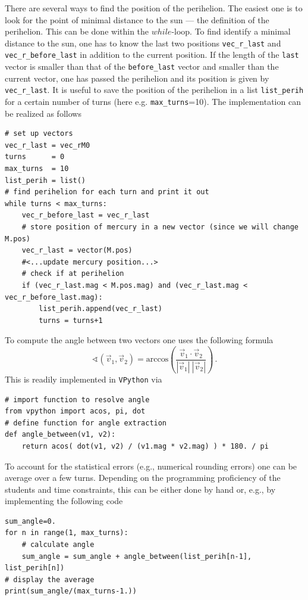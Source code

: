 \documentclass[12pt, UK english]{iopart}
\begin{document}
There are several ways to find the position of the perihelion.
The easiest one is to look for the point of minimal distance to the sun --- the definition of the perihelion.
This can be done within the $while$-loop.
To find identify a minimal distance to the sun, one has to know the last two positions \texttt{vec\_r\_last} and \texttt{vec\_r\_before\_last} in addition to the current position.
If the length of the \texttt{last} vector is smaller than that of the \texttt{before\_last} vector and smaller than the current vector, one has passed the perihelion and its position is given by \texttt{vec\_r\_last}.
It is useful to save the position of the perihelion in a list \texttt{list\_perih} for a certain number of turns (here e.g. \texttt{max\_turns}=10).
The implementation can be realized as follows
\begin{lstlisting}
# set up vectors
vec_r_last = vec_rM0
turns      = 0
max_turns  = 10
list_perih = list()
# find perihelion for each turn and print it out
while turns < max_turns:
	vec_r_before_last = vec_r_last
	# store position of mercury in a new vector (since we will change M.pos)
	vec_r_last = vector(M.pos)
	#<...update mercury position...>
	# check if at perihelion
	if (vec_r_last.mag < M.pos.mag) and (vec_r_last.mag < vec_r_before_last.mag):
		list_perih.append(vec_r_last)
		turns = turns+1
\end{lstlisting}
To compute the angle between two vectors one uses the following
formula
 \begin{equation}
 	\sphericalangle(\vec{v}_{1},\vec{v}_2) = \mathrm{arccos} \left( \frac{\vec{v}_{1} \cdot \vec{v}_2}{|\vec{v}_{1}|\:|\vec{v}_2|} \right)
	\, .
 \end{equation}
This is readily implemented in \texttt{VPython} via
\begin{lstlisting}
# import function to resolve angle
from vpython import acos, pi, dot
# define function for angle extraction
def angle_between(v1, v2):
	return acos( dot(v1, v2) / (v1.mag * v2.mag) ) * 180. / pi
\end{lstlisting}
To account for the statistical errors (e.g., numerical rounding errors) one can be average over a few turns.
Depending on the programming proficiency of the students and time constraints, this can be either done by hand or, e.g., by implementing the following code
\begin{lstlisting}
sum_angle=0.
for n in range(1, max_turns):
	# calculate angle
	sum_angle = sum_angle + angle_between(list_perih[n-1], list_perih[n])
# display the average
print(sum_angle/(max_turns-1.))
\end{lstlisting}
\end{document}
